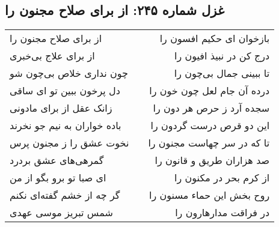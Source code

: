 \begin{center}
\section*{غزل شماره ۲۴۵: از برای صلاح مجنون را}
\label{sec:0245}
\begin{longtable}{l p{0.5cm} r}
از برای صلاح مجنون را
&&
بازخوان ای حکیم افسون را
\\
از برای علاج بی‌خبری
&&
درج کن در نبیذ افیون را
\\
چون نداری خلاص بی‌چون شو
&&
تا ببینی جمال بی‌چون را
\\
دل پرخون ببین تو ای ساقی
&&
درده آن جام لعل چون خون را
\\
زانک عقل از برای مادونی
&&
سجده آرد ز حرص هر دون را
\\
باده خواران به نیم جو نخرند
&&
این دو قرص درست گردون را
\\
نخوت عشق را ز مجنون پرس
&&
تا که در سر چهاست مجنون را
\\
گمرهی‌های عشق بردرد
&&
صد هزاران طریق و قانون را
\\
ای صبا تو برو بگو از من
&&
از کرم بحر در مکنون را
\\
گر چه از خشم گفته‌ای نکنم
&&
روح بخش این حماء مسنون را
\\
شمس تبریز موسی عهدی
&&
در فراقت مدارهارون را
\\
\end{longtable}
\end{center}
